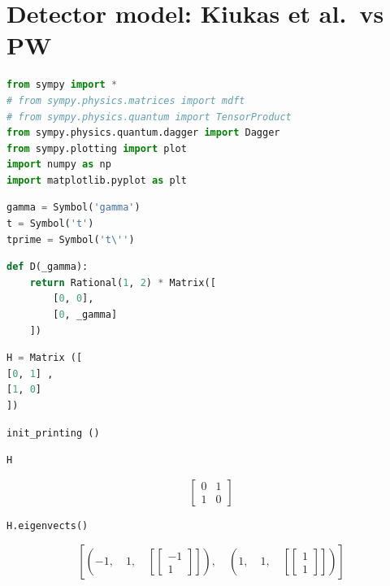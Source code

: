 \hypertarget{detector-model-kiukas-et-al.vs-pw}{%
\section{Detector model: Kiukas et al.~vs
PW}\label{detector-model-kiukas-et-al.vs-pw}}

\begin{lstlisting}[language=Python]
from sympy import *
# from sympy.physics.matrices import mdft
# from sympy.physics.quantum import TensorProduct
from sympy.physics.quantum.dagger import Dagger
from sympy.plotting import plot
import numpy as np
import matplotlib.pyplot as plt
\end{lstlisting}

\begin{lstlisting}[language=Python]
gamma = Symbol('gamma')
t = Symbol('t')
tprime = Symbol('t\'')
\end{lstlisting}

\begin{lstlisting}[language=Python]
def D(_gamma):
    return Rational(1, 2) * Matrix([
        [0, 0],
        [0, _gamma]
    ])
\end{lstlisting}

\begin{lstlisting}[language=Python]
H = Matrix ([
[0, 1] ,
[1, 0]
])
\end{lstlisting}

\begin{lstlisting}[language=Python]
init_printing ()
\end{lstlisting}

\begin{lstlisting}[language=Python]
H
\end{lstlisting}

\[\left[\begin{matrix}0 & 1\\1 & 0\end{matrix}\right]\]

\begin{lstlisting}[language=Python]
H.eigenvects()
\end{lstlisting}

\[\left [ \left ( -1, \quad 1, \quad \left [ \left[\begin{matrix}-1\\1\end{matrix}\right]\right ]\right ), \quad \left ( 1, \quad 1, \quad \left [ \left[\begin{matrix}1\\1\end{matrix}\right]\right ]\right )\right ]\]

